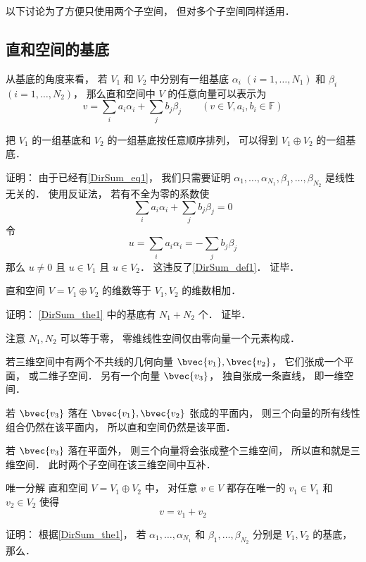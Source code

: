 以下讨论为了方便只使用两个子空间， 但对多个子空间同样适用．

\subsection{直和空间的基底}
从基底的角度来看， 若 $V_1$ 和 $V_2$ 中分别有一组基底 ${\alpha_i}$ $(i = 1, \dots, N_1)$ 和 ${\beta_i}$ $(i = 1, \dots, N_2)$， 那么直和空间中 $V$ 的任意向量可以表示为
\begin{equation}\label{DirSum_eq1}
{v} = \sum_i a_i {\alpha_i} + \sum_j b_j {\beta_j} \qquad (v\in V, a_i, b_i \in \mathbb F)
\end{equation}
\begin{theorem}{}\label{DirSum_the1}
把 $V_1$ 的一组基底和 $V_2$ 的一组基底按任意顺序排列， 可以得到 $V_1 \oplus V_2$ 的一组基底．
\end{theorem}

证明： 由于已经有\autoref{DirSum_eq1}， 我们只需要证明 $\alpha_1, \dots, \alpha_{N_1}, \beta_1, \dots, \beta_{N_2}$ 是线性无关的． 使用反证法， 若有不全为零的系数使
\begin{equation}
\sum_i a_i {\alpha_i} + \sum_j b_j {\beta_j} = 0
\end{equation}
令
\begin{equation}
u = \sum_i a_i {\alpha_i} = -\sum_j b_j {\beta_j}
\end{equation}
那么 $u \ne 0$ 且 $u \in V_1$ 且 $u \in V_2$． 这违反了\autoref{DirSum_def1}． 证毕．

\begin{corollary}{}\label{DirSum_cor1}
直和空间 $V = V_1 \oplus V_2$ 的维数等于 $V_1, V_2$ 的维数相加．
\end{corollary}
证明： \autoref{DirSum_the1} 中的基底有 $N_1 + N_2$ 个． 证毕．

注意 $N_1, N_2$ 可以等于零， 零维线性空间仅由零向量一个元素构成．

\begin{example}{}\label{DirSum_ex1}
若三维空间中有两个不共线的几何向量 $\bvec{v_1}, \bvec{v_2}$， 它们张成一个平面， 或二维子空间． 另有一个向量 $\bvec{v_3}$， 独自张成一条直线， 即一维空间．

若 $\bvec{v_3}$ 落在 $\bvec{v_1}, \bvec{v_2}$ 张成的平面内， 则三个向量的所有线性组合仍然在该平面内， 所以直和空间仍然是该平面．

若 $\bvec{v_3}$ 落在平面外， 则三个向量将会张成整个三维空间， 所以直和就是三维空间． 此时两个子空间在该三维空间中互补．
\end{example}

\begin{theorem}{唯一分解}
直和空间 $V = V_1 \oplus V_2$ 中， 对任意 $v \in V$ 都存在唯一的 $v_1 \in V_1$ 和 $v_2 \in V_2$ 使得
\begin{equation}
v = v_1 + v_2
\end{equation}
\end{theorem}
证明： 根据\autoref{DirSum_the1}， 若 $\alpha_1, \dots, \alpha_{N_1}$ 和 $\beta_1, \dots, \beta_{N_2}$ 分别是 $V_1, V_2$ 的基底， 那么．


